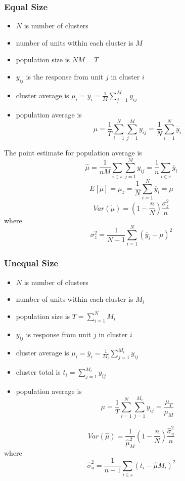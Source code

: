 \documentclass[11pt]{article}
\begin{document}
\subsubsection{Equal Size}
\begin{itemize}
    \item $N$ is number of clusters 
    \item number of units within each cluster is $M$
    \item population size is $NM=T$
    \item $y_{ij}$ is the response from unit $j$ in cluster $i$
    \item cluster average is $\mu_i=\overline{y}_i = \frac{1}{M}\sum_{j=1}^{M}y_{ij}$
    \item population average is \[\mu = \frac{1}{T}\sum_{i=1}^{N}\sum_{j=1}^{M}y_{ij} = \frac{1}{N}\sum_{i=1}^{N}\overline{y}_i\]
\end{itemize}
The point estimate for population average is 
\[\hat\mu = \frac{1}{nM}\sum_{i\in s}\sum_{j=1}^{M}y_{ij} = \frac{1}{n}\sum_{i\in s}\overline{y}_i\]
\[E[\tilde{\mu}]=\mu_z = \frac{1}{N}\sum_{i=1}^{N}\overline{y}_i = \mu\]
\[Var(\tilde{\mu}) = (1-\frac{n}{N})\frac{\sigma_z^2}{n}\]
where \[\sigma^2_z = \frac{1}{N-1}\sum_{i=1}^{N}(\overline{y}_i - \mu)^2\]
\subsubsection{Unequal Size}
\begin{itemize}
    \item $N$ is number of clusters 
    \item number of units within each cluster is $M_i$
    \item population size is $T=\sum_{i=1}^{N}M_i$
    \item $y_{ij}$ is response from unit $j$ in cluster $i$
    \item cluster average is $\mu_i=\overline{y}_i = \frac{1}{M_i}\sum_{j=1}^{M_i}y_{ij}$
    \item cluster total is $t_i = \sum_{j=1}^{M_i}y_{ij}$
    \item population average is \[\mu = \frac{1}{T}\sum_{i=1}^{N}\sum_{j=1}^{M_i}y_{ij} = \frac{\mu_T}{\mu_M}\]
\end{itemize}
\[Var(\hat\mu) = \frac{1}{\hat\mu^2_M}(1-\frac{n}{N})\frac{\hat\sigma^2_u}{n}\]
where \[\hat\sigma^2_u = \frac{1}{n-1}\sum_{i\in s}(t_i - \hat\mu M_i)^2\]
\end{document}
